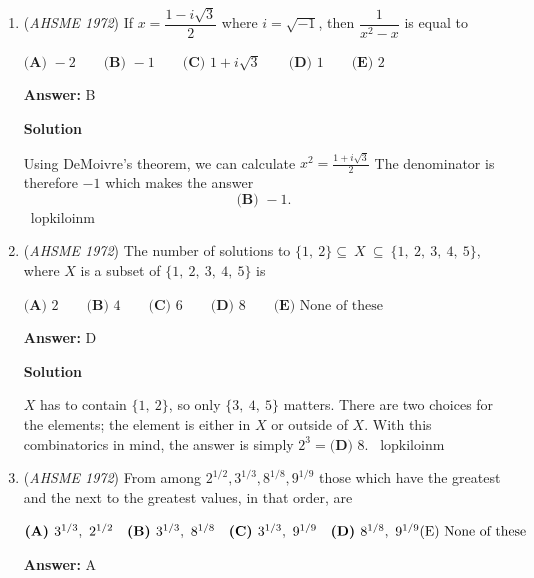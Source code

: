 \begin{enumerate}
 

 \[c(1+0.01x) = 0.92c(1 + 0.01(x+10))\]

 Solving for $x$ yields $x = 15.$ The answer is $\textbf{(B)}.$

 -edited by coolmath34

 


	\item (\textit{AHSME 1972}) If $x=\dfrac{1-i\sqrt{3}}{2}$ where $i=\sqrt{-1}$, then $\dfrac{1}{x^2-x}$ is equal to


 $\textbf{(A) }-2\qquad \textbf{(B) }-1\qquad \textbf{(C) }1+i\sqrt{3}\qquad \textbf{(D) }1\qquad  \textbf{(E) }2$

 \textbf{Answer: }B



\textbf{Solution}

Using DeMoivre's theorem, we can calculate $x^2=\frac{1+i\sqrt{3}}{2}$ The denominator is therefore $-1$ which makes the answer 
 \[\boxed{\textbf{(B) }-1}.\] ~lopkiloinm

 


	\item (\textit{AHSME 1972}) The number of solutions to $\{1,~2\}\subseteq~X~\subseteq~\{1,~2,~3,~4,~5\}$, where $X$ is a subset of $\{1,~2,~3,~4,~5\}$ is


 $\textbf{(A) }2\qquad \textbf{(B) }4\qquad \textbf{(C) }6\qquad \textbf{(D) }8\qquad  \textbf{(E) }\text{None of these}$

 \textbf{Answer: }D



\textbf{Solution}

$X$ has to contain $\{1,~2\}$, so only $\{3,~4,~5\}$ matters. There are two choices for the elements; the element is either in $X$ or outside of $X$. With this combinatorics in mind, the answer is simply $2^3=\boxed{\textbf{(D) }8}.$ ~lopkiloinm

 


	\item (\textit{AHSME 1972}) From among $2^{1/2}, 3^{1/3}, 8^{1/8}, 9^{1/9}$ those which have the greatest and the next to the greatest values, in that order, are 


 $\textbf{(A) } 3^{1/3},\ 2^{1/2}\quad  \textbf{(B) } 3^{1/3},\ 8^{1/8}\quad  \textbf{(C) } 3^{1/3},\ 9^{1/9}\quad  \textbf{(D) } 8^{1/8},\ 9^{1/9}\quad \\  \text{(E) None of these}$

 \textbf{Answer: }A




\end{enumerate}
